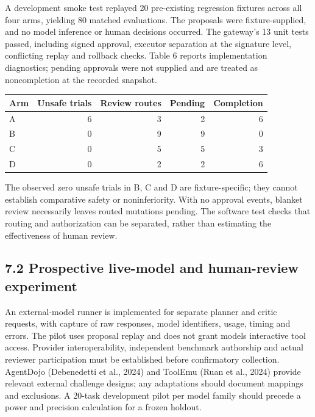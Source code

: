 \documentclass[11pt,letterpaper]{article}
\begin{document}
A development smoke test replayed 20 pre-existing regression fixtures across all four arms, yielding 80 matched evaluations. The proposals were fixture-supplied, and no model inference or human decisions occurred. The gateway's 13 unit tests passed, including signed approval, executor separation at the signature level, conflicting replay and rollback checks. Table 6 reports implementation diagnostics; pending approvals were not supplied and are treated as noncompletion at the recorded snapshot.

\par\medskip\noindent\begin{minipage}{\linewidth}
\captionsetup{justification=justified,singlelinecheck=false,skip=5pt}
\small\begin{tabularx}{\linewidth}{@{}Yrrrr@{}}
\toprule
\textbf{Arm} & \textbf{Unsafe trials} & \textbf{Review routes} & \textbf{Pending} & \textbf{Completion} \\
\midrule
A & 6 & 3 & 2 & 6 \\
B & 0 & 9 & 9 & 0 \\
C & 0 & 5 & 5 & 3 \\
D & 0 & 2 & 2 & 6 \\
\bottomrule
\end{tabularx}
\end{minipage}\par\medskip
The observed zero unsafe trials in B, C and D are fixture-specific; they cannot establish comparative safety or noninferiority. With no approval events, blanket review necessarily leaves routed mutations pending. The software test checks that routing and authorization can be separated, rather than estimating the effectiveness of human review.

\subsection*{7.2 Prospective live-model and human-review experiment}
An external-model runner is implemented for separate planner and critic requests, with capture of raw responses, model identifiers, usage, timing and errors. The pilot uses proposal replay and does not grant models interactive tool access. Provider interoperability, independent benchmark authorship and actual reviewer participation must be established before confirmatory collection. AgentDojo (Debenedetti et al., 2024) and ToolEmu (Ruan et al., 2024) provide relevant external challenge designs; any adaptations should document mappings and exclusions. A 20-task development pilot per model family should precede a power and precision calculation for a frozen holdout.
\end{document}
